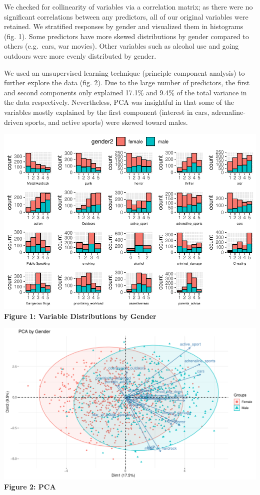 \documentclass[]{article}
\begin{document}
We checked for collinearity of variables via a correlation matrix; as
there were no significant correlations between any predictors, all of
our original variables were retained. We stratified responses by gender
and visualized them in histograms (fig. 1). Some predictors have more
skewed distributions by gender compared to others (e.g.~cars, war
movies). Other variables such as alcohol use and going outdoors were
more evenly distributed by gender.

We used an unsupervised learning technique (principle component
analysis) to further explore the data (fig. 2). Due to the large number
of predictors, the first and second components only explained 17.1\% and
9.4\% of the total variance in the data respectively. Nevertheless, PCA
was insightful in that some of the variables mostly explained by the
first component (interest in cars, adrenaline-driven sports, and active
sports) were skewed toward males.

\includegraphics{final_report_files/figure-latex/unnamed-chunk-1-1.pdf}
\textbf{Figure 1: Variable Distributions by Gender}

\includegraphics{final_report_files/figure-latex/unnamed-chunk-2-1.pdf}
\textbf{Figure 2: PCA}
\end{document}

